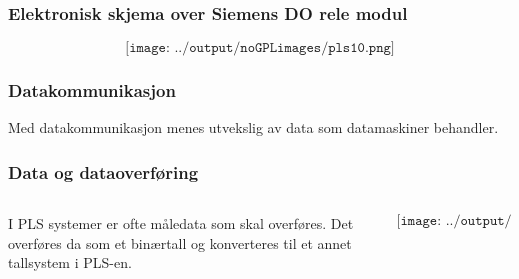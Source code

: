 \documentclass[aspectratio=169,xcolor=dvipsnames]{beamer}
\begin{document}
\begin{frame}
	\frametitle{Elektronisk skjema over Siemens DO rele modul}
	$$\texttt{[image: ../output/noGPLimages/pls10.png]}$$
\end{frame}
\begin{frame}
	\frametitle{Datakommunikasjon}
Med datakommunikasjon menes utvekslig av data som datamaskiner behandler. 
\end{frame}




\begin{frame}
	\frametitle{Data og dataoverføring}
	\begin{columns}
		\begin{column}{0.5\textwidth}
I PLS systemer er ofte måledata som skal overføres. Det overføres da som et binærtall og konverteres til et annet tallsystem i PLS-en. 

			
		\end{column}

		\begin{column}{0.5\textwidth}
	$$\texttt{[image: ../output/noGPLimages/kap5x01]}$$
		\end{column}
	\end{columns}
\end{frame}
\end{document}
